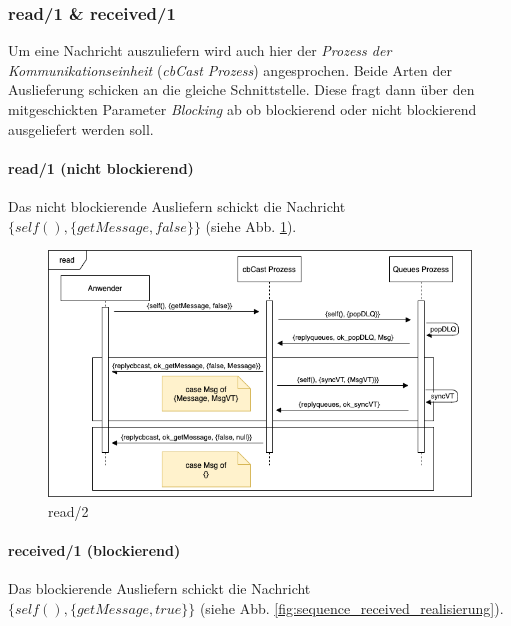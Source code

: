 \subsubsection{read/1 \& received/1} \label{cbcast_read_received_realisierung}

Um eine Nachricht auszuliefern wird auch hier der \textit{Prozess der Kommunikationseinheit} (\textit{cbCast Prozess}) angesprochen. Beide Arten der Auslieferung schicken an die gleiche Schnittstelle. Diese fragt dann über den mitgeschickten Parameter \textit{Blocking} ab ob blockierend oder nicht blockierend ausgeliefert werden soll.

\paragraph{read/1 (nicht blockierend)}

Das nicht blockierende Ausliefern schickt die Nachricht $\{self(), \{getMessage, false\}\}$ (siehe Abb. \ref{fig:sequence_read_realisierung}).

\begin{figure}[htbp]
\begin{center}
\includegraphics[scale=0.6]{Latex/Bilder/read_realisierung.png}
\caption{\label{fig:sequence_read_realisierung} read/2}
\end{center}
\end{figure}

\paragraph{received/1 (blockierend)}

Das blockierende Ausliefern schickt die Nachricht \\$\{self(), \{getMessage, true\}\}$ (siehe Abb. \ref{fig:sequence_received_realisierung}).

